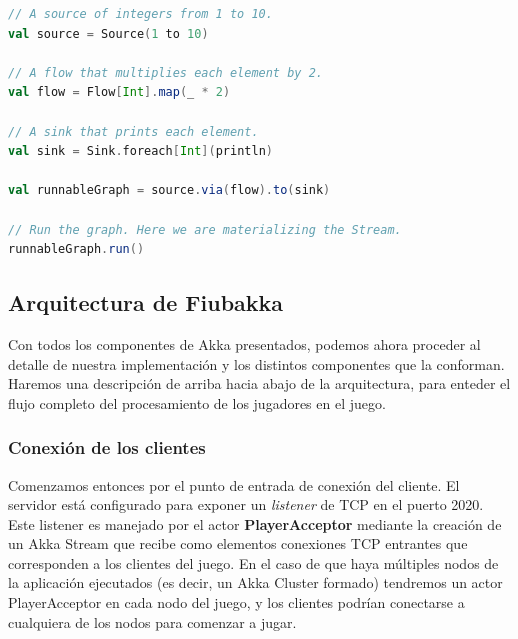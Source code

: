 \begin{lstlisting}[language=Scala, caption={\textbf{Ejemplo de un Akka Stream}}]
// A source of integers from 1 to 10.
val source = Source(1 to 10)

// A flow that multiplies each element by 2.
val flow = Flow[Int].map(_ * 2)

// A sink that prints each element.
val sink = Sink.foreach[Int](println)

val runnableGraph = source.via(flow).to(sink)

// Run the graph. Here we are materializing the Stream.
runnableGraph.run()
\end{lstlisting}

\subsection{Arquitectura de Fiubakka}

\noindent Con todos los componentes de Akka presentados, podemos ahora proceder al detalle de nuestra implementación y los distintos componentes
que la conforman. Haremos una descripción de arriba hacia abajo de la arquitectura, para enteder el flujo completo del procesamiento de
los jugadores en el juego.

\subsubsection{Conexión de los clientes}

\noindent Comenzamos entonces por el punto de entrada de conexión del cliente. El servidor está configurado para exponer un \textit{listener} de TCP en el puerto 2020.
Este listener es manejado por el actor \textbf{PlayerAcceptor} mediante la creación de un Akka Stream que recibe como elementos
conexiones TCP entrantes que corresponden a los clientes del juego. En el caso de que haya múltiples nodos de la aplicación ejecutados (es decir, un Akka Cluster
formado) tendremos un actor PlayerAcceptor en cada nodo del juego, y los clientes podrían conectarse a cualquiera de los nodos para comenzar a jugar.

